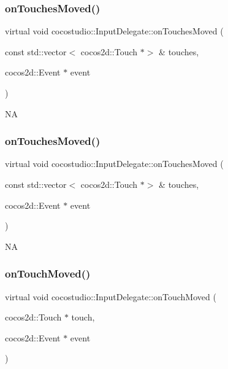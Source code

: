 \subsubsection{\texorpdfstring{on\+Touches\+Moved()}{onTouchesMoved()}\hspace{0.1cm}{\footnotesize\ttfamily [1/2]}}
{\footnotesize\ttfamily virtual void cocostudio\+::\+Input\+Delegate\+::on\+Touches\+Moved (\begin{DoxyParamCaption}\item[{const std\+::vector$<$ cocos2d\+::\+Touch $\ast$$>$ \&}]{touches,  }\item[{cocos2d\+::\+Event $\ast$}]{event }\end{DoxyParamCaption})\hspace{0.3cm}{\ttfamily [virtual]}}

NA \mbox{\label{classcocostudio_1_1InputDelegate_ad81bf5704d33542be199908c064f6a3e}} 
\subsubsection{\texorpdfstring{on\+Touches\+Moved()}{onTouchesMoved()}\hspace{0.1cm}{\footnotesize\ttfamily [2/2]}}
{\footnotesize\ttfamily virtual void cocostudio\+::\+Input\+Delegate\+::on\+Touches\+Moved (\begin{DoxyParamCaption}\item[{const std\+::vector$<$ cocos2d\+::\+Touch $\ast$$>$ \&}]{touches,  }\item[{cocos2d\+::\+Event $\ast$}]{event }\end{DoxyParamCaption})\hspace{0.3cm}{\ttfamily [virtual]}}

NA \mbox{\label{classcocostudio_1_1InputDelegate_adc37729914cd05f43538d18ee14abfce}} 
\subsubsection{\texorpdfstring{on\+Touch\+Moved()}{onTouchMoved()}\hspace{0.1cm}{\footnotesize\ttfamily [1/2]}}
{\footnotesize\ttfamily virtual void cocostudio\+::\+Input\+Delegate\+::on\+Touch\+Moved (\begin{DoxyParamCaption}\item[{cocos2d\+::\+Touch $\ast$}]{touch,  }\item[{cocos2d\+::\+Event $\ast$}]{event }\end{DoxyParamCaption})\hspace{0.3cm}{\ttfamily [virtual]}}

